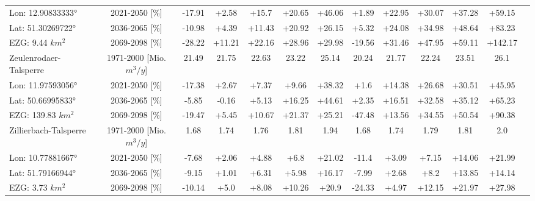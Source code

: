 \begin{longtable}{@{\extracolsep{\fill}}lc|ccccc||cccccc}
\cline{2-13} 
Lon: 12.90833333° & 2021-2050 [\%]  & -17.91 & +2.58 & +15.7 & +20.65 & +46.06 & +1.89 & +22.95 & +30.07 & +37.28 & +59.15 & \\ 
Lat: 51.30269722° & 2036-2065 [\%]  & -10.98 & +4.39 & +11.43 & +20.92 & +26.15 & +5.32 & +24.08 & +34.98 & +48.64 & +83.23 & \\ 
EZG: 9.44 $km^2$ & 2069-2098 [\%]  & -28.22 & +11.21 & +22.16 & +28.96 & +29.98 & -19.56 & +31.46 & +47.95 & +59.11 & +142.17 & \\ 
\hline 
Zeulenrodaer-Talsperre & 1971-2000 [Mio. $m^3/y$]  & 21.49 & 21.75 & 22.63 & 23.22 & 25.14 & 20.24 & 21.77 & 22.24 & 23.51 & 26.1 & \\ 
\cline{2-13} 
Lon: 11.97593056° & 2021-2050 [\%]  & -17.38 & +2.67 & +7.37 & +9.66 & +38.32 & +1.6 & +14.38 & +26.68 & +30.51 & +45.95 & \\ 
Lat: 50.66995833° & 2036-2065 [\%]  & -5.85 & -0.16 & +5.13 & +16.25 & +44.61 & +2.35 & +16.51 & +32.58 & +35.12 & +65.23 & \\ 
EZG: 139.83 $km^2$ & 2069-2098 [\%]  & -19.47 & +5.45 & +10.67 & +21.37 & +25.21 & -47.48 & +13.56 & +34.55 & +50.54 & +90.38 & \\ 
\hline 
Zillierbach-Talsperre & 1971-2000 [Mio. $m^3/y$]  & 1.68 & 1.74 & 1.76 & 1.81 & 1.94 & 1.68 & 1.74 & 1.79 & 1.81 & 2.0 & \\ 
\cline{2-13} 
Lon: 10.77881667° & 2021-2050 [\%]  & -7.68 & +2.06 & +4.88 & +6.8 & +21.02 & -11.4 & +3.09 & +7.15 & +14.06 & +21.99 & \\ 
Lat: 51.79166944° & 2036-2065 [\%]  & -9.15 & +1.01 & +6.31 & +5.98 & +16.17 & -7.99 & +2.68 & +8.2 & +13.85 & +14.14 & \\ 
EZG: 3.73 $km^2$ & 2069-2098 [\%]  & -10.14 & +5.0 & +8.08 & +10.26 & +20.9 & -24.33 & +4.97 & +12.15 & +21.97 & +27.98 & \\\hline
\end{longtable}
\addtolength{\tabcolsep}{5.9pt}

